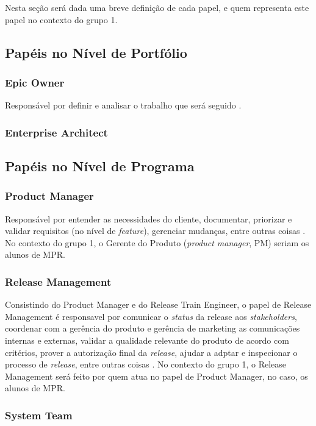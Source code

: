 Nesta seção será dada uma breve definição de cada papel, e quem representa este papel no contexto do grupo 1.

\subsection{Papéis no Nível de Portfólio}
\subsubsection{Epic Owner}
Responsável por definir e analisar o trabalho que será seguido \cite{safe007}.

\subsubsection{Enterprise Architect}


\subsection{Papéis no Nível de Programa}

\subsubsection{Product Manager}
Responsável por entender as necessidades do cliente, documentar, priorizar e validar requisitos (no nível de \emph{feature}), gerenciar mudanças, entre outras coisas \cite{safe010}. No contexto do grupo 1, o Gerente do Produto (\emph{product manager}, PM) seriam os alunos de MPR.

\subsubsection{Release Management}
Consistindo do Product Manager e do Release Train Engineer, o papel de Release Management é responsavel por comunicar o \emph{status} da release aos \emph{stakeholders}, coordenar com a gerência do produto e gerência de marketing as comunicações internas e externas, validar a qualidade relevante do produto de acordo com critérios, prover a autorização final da \emph{release}, ajudar a adptar e inspecionar o processo de \emph{release}, entre outras coisas \cite{safesite001}.
No contexto do grupo 1, o Release Management será feito por quem atua no papel de Product Manager, no caso, os alunos de MPR.

\subsubsection{System Team}
